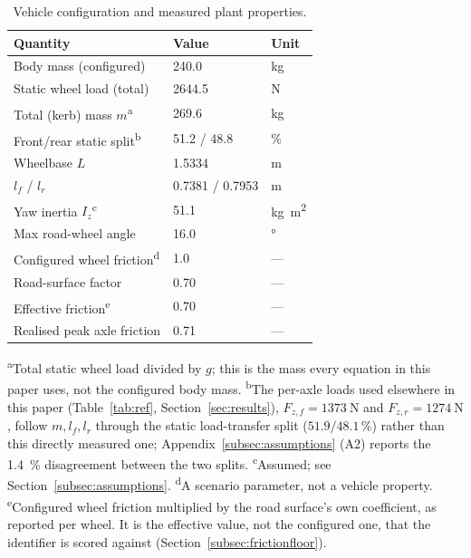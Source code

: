 \begin{table}[t]
\caption{Vehicle configuration and measured plant properties.}
\label{tab:vehicle}
\centering
\scriptsize
\setlength{\tabcolsep}{4pt}
\begin{tabular}{@{}lll@{}}
\toprule
Quantity  & Value & Unit\\
\midrule
Body mass (configured) & 240.0 & \si{\kilo\gram}\\
Static wheel load (total)      & 2644.5 & \si{\newton}\\
Total (kerb) mass $m$\textsuperscript{a} & 269.6 & \si{\kilo\gram}\\
Front/rear static split\textsuperscript{b}        & 51.2 / 48.8 & \si{\percent}\\
Wheelbase $L$                  & 1.5334 & \si{\meter}\\
$l_{f}$ / $l_{r}$              & 0.7381 / 0.7953 & \si{\meter}\\
Yaw inertia $I_{z}$\textsuperscript{c} & 51.1 & \si{\kilo\gram\meter\squared}\\
Max road-wheel angle           & 16.0 & \si{\degree}\\
Configured wheel friction\textsuperscript{d} & 1.0 & ---\\
Road-surface factor & 0.70 & ---\\
Effective friction\textsuperscript{e} & 0.70 & ---\\
Realised peak axle friction    & 0.71 & ---\\
\bottomrule
\end{tabular}

\vspace{2pt}
{\raggedright\footnotesize \textsuperscript{a}Total static wheel load divided
by $g$; this is the mass every equation in this paper uses, not the configured
body mass.
\textsuperscript{b}The per-axle loads used elsewhere in this paper
(Table~\ref{tab:ref}, Section~\ref{sec:results}), $F_{z,f}=\SI{1373}{\newton}$
and $F_{z,r}=\SI{1274}{\newton}$, follow $m,l_{f},l_{r}$ through the static
load-transfer split ($51.9/48.1\,\si{\percent}$) rather than this directly
measured one; Appendix~\ref{subsec:assumptions} (A2) reports the
\SI{1.4}{\percent} disagreement between the two splits.
\textsuperscript{c}Assumed; see Section~\ref{subsec:assumptions}.
\textsuperscript{d}A scenario parameter, not a vehicle property.
\textsuperscript{e}Configured wheel friction multiplied by the road surface's
own coefficient, as reported per wheel. It is the effective value, not the
configured one, that the identifier is scored against
(Section~\ref{subsec:frictionfloor}).\par}
\end{table}

